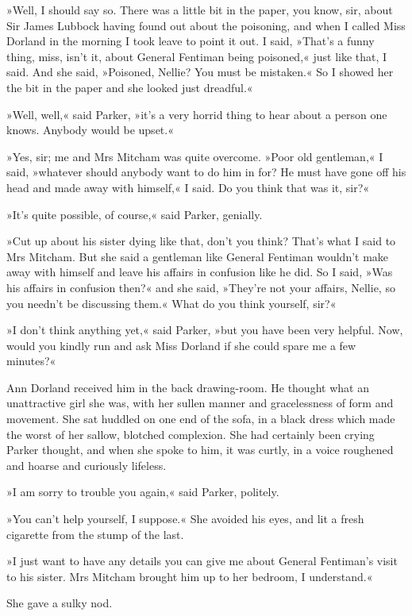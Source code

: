 »Well, I should say so. There was a little bit in the paper, you know, sir, about Sir James Lubbock having found out about the poisoning, and when I called Miss Dorland in the morning I took leave to point it out. I said, »That's a funny thing, miss, isn't it, about General Fentiman being poisoned,« just like that, I said. And she said, »Poisoned, Nellie? You must be mistaken.« So I showed her the bit in the paper and she looked just dreadful.«

»Well, well,« said Parker, »it's a very horrid thing to hear about a person one knows. Anybody would be upset.«

»Yes, sir; me and Mrs Mitcham was quite overcome. »Poor old gentleman,« I said, »whatever should anybody want to do him in for? He must have gone off his head and made away with himself,« I said. Do you think that was it, sir?«

»It's quite possible, of course,« said Parker, genially.

»Cut up about his sister dying like that, don't you think? That's what I said to Mrs Mitcham. But she said a gentleman like General Fentiman wouldn't make away with himself and leave his affairs in confusion like he did. So I said, »Was his affairs in confusion then?« and she said, »They're not your affairs, Nellie, so you needn't be discussing them.« What do you think yourself, sir?«

»I don't think anything yet,« said Parker, »but you have been very helpful. Now, would you kindly run and ask Miss Dorland if she could spare me a few minutes?«

Ann Dorland received him in the back drawing-room. He thought what an unattractive girl she was, with her sullen manner and gracelessness of form and movement. She sat huddled on one end of the sofa, in a black dress which made the worst of her sallow, blotched complexion. She had certainly been crying Parker thought, and when she spoke to him, it was curtly, in a voice roughened and hoarse and curiously lifeless.

»I am sorry to trouble you again,« said Parker, politely.

»You can't help yourself, I suppose.« She avoided his eyes, and lit a fresh cigarette from the stump of the last.

»I just want to have any details you can give me about General Fentiman's visit to his sister. Mrs Mitcham brought him up to her bedroom, I understand.«

She gave a sulky nod.

